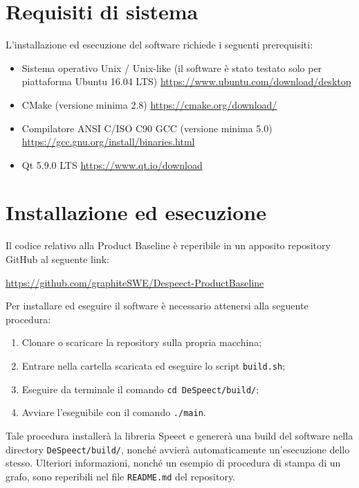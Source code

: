 \documentclass[openany,12pt,a4paper]{report}
\begin{document}
	\chapter{Requisiti di sistema}
	
	L'installazione ed esecuzione del software richiede i seguenti prerequisiti:
	
	\begin{itemize}
		\item Sistema operativo Unix / Unix-like (il software è stato testato solo per piattaforma Ubuntu 16.04 LTS)
		\subitem \url{https://www.ubuntu.com/download/desktop}
		\item CMake (versione minima 2.8)
		\subitem \url{https://cmake.org/download/}
		\item Compilatore ANSI C/ISO C90 GCC (versione minima 5.0)
		\subitem \url{https://gcc.gnu.org/install/binaries.html}
		\item Qt 5.9.0 LTS
		\subitem \url{https://www.qt.io/download}
	\end{itemize}

	\chapter{Installazione ed esecuzione}
	
	Il codice relativo alla Product Baseline è reperibile in un apposito repository GitHub al seguente link:
	\begin{center}
		\url{https://github.com/graphiteSWE/Despeect-ProductBaseline}
	\end{center} 

	\noindent Per installare ed eseguire il software è necessario attenersi alla seguente procedura:
	\begin{enumerate}
		\item Clonare o scaricare la repository sulla propria macchina;
		\item Entrare nella cartella scaricata ed eseguire lo script \verb|build.sh|;
		\item Eseguire da terminale il comando \verb|cd DeSpeect/build/|;
		\item Avviare l'eseguibile con il comando \verb|./main|.
	\end{enumerate}
	Tale procedura installerà la libreria Speect e genererà una build del software nella directory \verb|DeSpeect/build/|, nonché avvierà automaticamente un'esecuzione dello stesso. Ulteriori informazioni, nonché un esempio di procedura di stampa di un grafo, sono reperibili nel file \verb|README.md| del repository.
\end{document}
